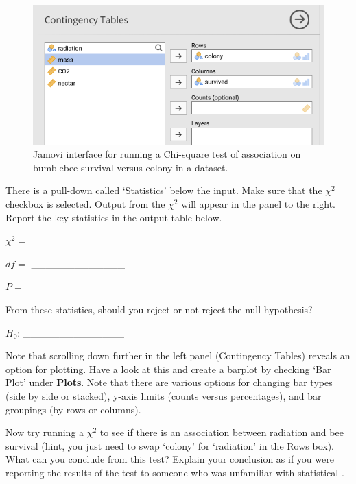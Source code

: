 \documentclass[
  openany]{krantz}
\begin{document}
\begin{figure}
\includegraphics[width=1\linewidth]{img/jamovi_test_of_association_interface} \caption{Jamovi interface for running a Chi-square test of association on bumblebee survival versus colony in a dataset.}\label{fig:unnamed-chunk-134}
\end{figure}

There is a pull-down called `Statistics' below the  input.
Make sure that the \(\chi^{2}\) checkbox is selected.
Output from the \(\chi^{2}\)  will appear in the panel to the right.
Report the key statistics in the output table below.

\(\chi^{2} =\) \_\_\_\_\_\_\_\_\_\_\_\_\_\_

\(df =\) \_\_\_\_\_\_\_\_\_\_\_\_\_

\(P =\) \_\_\_\_\_\_\_\_\_\_\_\_\_

From these statistics, should you reject or not reject the null hypothesis?

\(H_{0}\): \_\_\_\_\_\_\_\_\_\_\_\_\_\_

Note that scrolling down further in the left panel (Contingency Tables) reveals an option for plotting.
Have a look at this and create a barplot by checking `Bar Plot' under \textbf{Plots}.
Note that there are various options for changing bar types (side by side or stacked), y-axis limits (counts versus percentages), and bar groupings (by rows or columns).

Now try running a \(\chi^{2}\)  to see if there is an association between radiation and bee survival (hint, you just need to swap `colony' for `radiation' in the Rows box).
What can you conclude from this test?
Explain your conclusion as if you were reporting the results of the test to someone who was unfamiliar with statistical .
\end{document}
